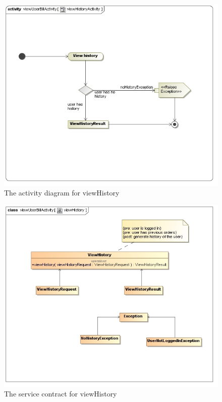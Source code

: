 \documentclass[a4paper,12pt]{report}
\begin{document}
\begin{figure}[H]
  \centering
    \includegraphics[width=1.0\textwidth]{../images/viewHistoryActivity.jpg}
    \caption{The activity diagram for viewHistory}
\end{figure}
\begin{figure}[H]
  \centering
    \includegraphics[width=1.0\textwidth]{../images/viewHistory.jpg}
    \caption{The service contract for viewHistory}
\end{figure}
\end{document}
